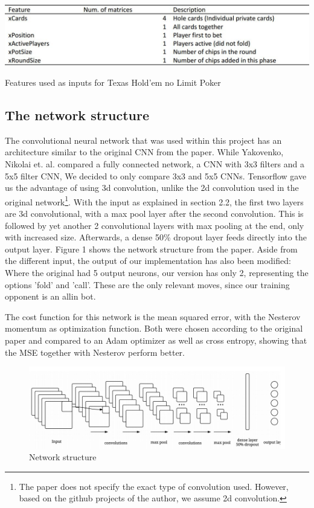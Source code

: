 \documentclass[]{report}
\begin{document}
\begin{table}
\includegraphics[scale=0.5]{Features.JPG}

\caption{Features used as inputs for Texas Hold'em no Limit Poker \label{tab:tensor}}

\end{table}
\subsection{The network structure \label{see:CNN_arc} }

The convolutional neural network that was used within this project has an architecture similar to the original CNN from the paper\cite{1}. While Yakovenko, Nikolai et. al. compared a fully connected network, a CNN with 3x3 filters and a 5x5 filter CNN, We decided to only compare 3x3 and 5x5 CNNs. Tensorflow gave us the advantage of using 3d convolution, unlike the 2d convolution used in the original network\footnote{The paper does not specify the exact type of convolution used. However, based on the github projects of the author, we assume 2d convolution.}. With the input as explained in section 2.2, the first two layers are 3d convolutional, with a max pool layer after the second convolution. This is followed by yet another 2 convolutional layers with max pooling at the end, only with increased size. 
Afterwards, a dense 50\% dropout layer feeds directly into the output layer. Figure 1 shows the network structure from the paper. Aside from the different input, the output of our implementation has also been modified: Where the original had 5 output neurons, our version has only 2, representing the options 'fold' and 'call'. These are the only relevant moves, since our training opponent is an allin bot.

The cost function for this network is the mean squared error, with the Nesterov momentum as optimization function. Both were chosen according to the original paper and compared to an Adam optimizer as well as cross entropy, showing that the MSE together with Nesterov perform better.


\begin{figure}[h]
	\caption{Network structure}
	\includegraphics[scale = 0.5]{cnn_structure.jpg}
\end{figure} 
\end{document}
